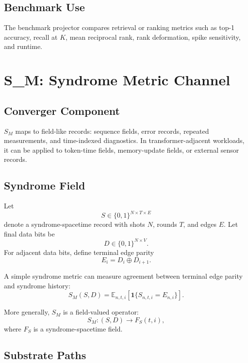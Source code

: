 \documentclass[11pt]{article}
\newcommand{\E}{\mathbb{E}}
\newcommand{\Sm}{S_M}
\begin{document}
\subsection{Benchmark Use}

The benchmark projector compares retrieval or ranking metrics such as top-1
accuracy, recall at \(K\), mean reciprocal rank, rank deformation, spike
sensitivity, and runtime.

\section{S\_M: Syndrome Metric Channel}

\subsection{Converger Component}

\(\Sm\) maps to field-like records: sequence fields, error records, repeated
measurements, and time-indexed diagnostics. In transformer-adjacent workloads,
it can be applied to token-time fields, memory-update fields, or external sensor
records.

\subsection{Syndrome Field}

Let
\[
  S \in \{0,1\}^{N \times T \times E}
\]
denote a syndrome-spacetime record with shots \(N\), rounds \(T\), and edges
\(E\). Let final data bits be
\[
  D \in \{0,1\}^{N \times V}.
\]
For adjacent data bits, define terminal edge parity
\begin{equation}
  E_i = D_i \oplus D_{i+1}.
\end{equation}

A simple syndrome metric can measure agreement between terminal edge parity and
syndrome history:
\begin{equation}
  \Sm(S,D)
  =
  \E_{n,t,i}
  \left[
    \mathbf{1}\{S_{n,t,i}=E_{n,i}\}
  \right].
\end{equation}

More generally, \(\Sm\) is a field-valued operator:
\begin{equation}
  \Sm : (S,D) \longrightarrow F_S(t,i),
\end{equation}
where \(F_S\) is a syndrome-spacetime field.

\subsection{Substrate Paths}
\end{document}
